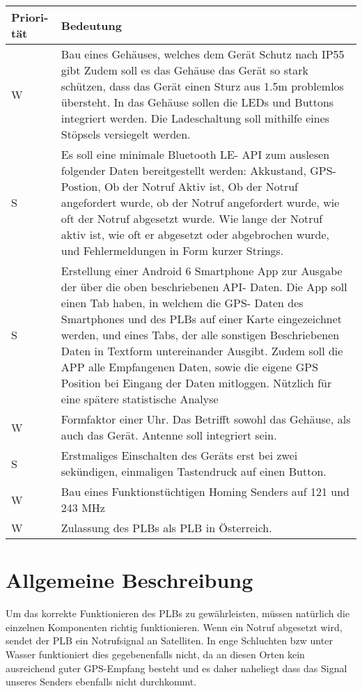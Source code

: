 \newpage
\begin{tabular}{| p{1.5cm} | p{13.5cm} |}
	
	\hline
	\textbf{Priori-} \newline \textbf{tät} & 
	\textbf{Bedeutung} \\
	\hline
	
	W & 
	Bau eines Gehäuses, welches dem Gerät Schutz nach IP55 gibt
	Zudem soll es das Gehäuse das Gerät so stark schützen, dass das Gerät einen Sturz aus 1.5m problemlos übersteht.
	In das Gehäuse sollen die LEDs und Buttons integriert werden. Die Ladeschaltung soll mithilfe eines Stöpsels versiegelt werden.\\
	\hline
	S &
	Es soll eine minimale Bluetooth LE- API zum auslesen folgender Daten bereitgestellt werden: Akkustand, GPS- Postion, Ob der Notruf Aktiv ist, Ob der Notruf angefordert wurde, ob der Notruf angefordert wurde, wie oft der Notruf abgesetzt wurde. Wie lange der Notruf aktiv ist, wie oft er abgesetzt oder abgebrochen wurde, und Fehlermeldungen in Form kurzer Strings.\\
	\hline
	S &
	Erstellung einer Android 6 Smartphone App zur Ausgabe der über die oben beschriebenen API- Daten. Die App soll einen Tab haben, in welchem die GPS- Daten des Smartphones und des PLBs auf einer Karte eingezeichnet werden, und eines Tabs, der alle sonstigen Beschriebenen Daten in Textform untereinander Ausgibt. Zudem soll die APP alle Empfangenen Daten, sowie die eigene GPS Position bei Eingang der Daten mitloggen. Nützlich für eine spätere statistische Analyse\\
	\hline
	
	W & 
	Formfaktor einer Uhr. Das Betrifft sowohl das Gehäuse, als auch das Gerät. Antenne soll integriert sein.\\
	\hline
	
	S &
	Erstmaliges Einschalten des Geräts erst bei zwei sekündigen, einmaligen Tastendruck auf einen Button.\\
	\hline
	
	W & 
	Bau eines Funktionstüchtigen Homing Senders auf 121 und 243 MHz\\
	\hline
	
	W & 
	Zulassung des PLBs als PLB in Österreich.\\
	\hline
	
\end{tabular}


\newpage

\section{Allgemeine Beschreibung}
Um das korrekte Funktionieren des PLBs zu gewährleisten, müssen natürlich die einzelnen Komponenten richtig funktionieren. Wenn ein Notruf abgesetzt wird, sendet der PLB ein Notrufsignal an Satelliten. In enge Schluchten bzw unter Wasser funktioniert dies gegebenenfalls nicht, da an diesen Orten kein ausreichend guter GPS-Empfang besteht und es daher naheliegt dass das Signal unseres Senders ebenfalls nicht durchkommt.


